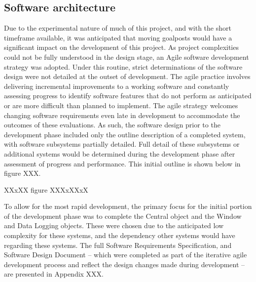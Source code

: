 \documentclass[main.tex]{subfiles}
\begin{document}
\subsection{Software architecture}
Due to the experimental nature of much of this project, and with the short timeframe available, it was anticipated that moving goalposts would have a significant impact on the development of this project. As project complexities could not be fully understood in the design stage, an Agile software development strategy was adopted. Under this routine, strict determinations of the software design were not detailed at the outset of development. The agile practice involves delivering incremental improvements to a working software and constantly assessing progress to identify software features that do not perform as anticipated or are more difficult than planned to implement. The agile strategy welcomes changing software requirements even late in development to accommodate the outcomes of these evaluations.
As such, the software design prior to the development phase included only the outline description of a completed system, with software subsystems partially detailed. Full detail of these subsystems or additional systems would be determined during the development phase after assessment of progress and performance. This initial outline is shown below in figure XXX.

XXxXX figure XXXxXXxX

To allow for the most rapid development, the primary focus for the initial portion of the development phase was to complete the Central object and the Window and Data Logging objects. These were chosen due to the anticipated low complexity for these systems, and the dependency other systems would have regarding these systems. The full Software Requirements Specification, and Software Design Document – which were completed as part of the iterative agile development process and reflect the design changes made during development – are presented in Appendix XXX.
\end{document}
